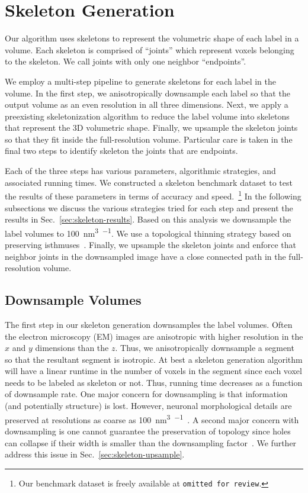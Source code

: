 \section{Skeleton Generation}

Our algorithm uses skeletons to represent the volumetric shape of each label in a volume.
Each skeleton is comprised of ``joints'' which represent voxels belonging to the skeleton.
We call joints with only one neighbor ``endpoints''.

We employ a multi-step pipeline to generate skeletons for each label in the volume.
In the first step, we anisotropically downsample each label so that the output volume as an even resolution in all three dimensions.
Next, we apply a preexisting skeletonization algorithm to reduce the label volume into skeletons that represent the 3D volumetric shape.
Finally, we upsample the skeleton joints so that they fit inside the full-resolution volume.
Particular care is taken in the final two steps to identify skeleton the joints that are endpoints.

Each of the three steps has various parameters, algorithmic strategies, and associated running times. 
We constructed a skeleton benchmark dataset to test the results of these parameters in terms of accuracy and speed.~\footnote{Our benchmark dataset is freely available at \texttt{omitted for review}.}
In the following subsections we discuss the various strategies tried for each step and present the results in Sec.~\ref{sec:skeleton-results}.
Based on this analysis we downsample the label volumes to \SI{100}{\cubic\nano\meter\per\voxel}.
We use a topological thinning strategy based on preserving isthmuses~\cite{palagyi2014sequential}.
Finally, we upsample the skeleton joints and enforce that neighbor joints in the downsampled image have a close connected path in the full-resolution volume. 

\subsection{Downsample Volumes}
	
The first step in our skeleton generation downsamples the label volumes.
Often the electron microscopy (EM) images are anisotropic with higher resolution in the $x$ and $y$ dimensions than the $z$. 
Thus, we anisotropically downsample a segment so that the resultant segment is isotropic.
At best a skeleton generation algorithm will have a linear runtime in the number of voxels in the segment since each voxel needs to be labeled as skeleton or not.
Thus, running time decreases as a function of downsample rate.
One major concern for downsampling is that information (and potentially structure) is lost.
However, neuronal morphological details are preserved at resolutions as coarse as \SI{100}{\cubic\nano\meter\per\voxel}~\cite{rolnick2017morphological}.
A second major concern with downsampling is one cannot guarantee the preservation of topology since holes can collapse if their width is smaller than the downsampling factor~\cite{kraus2001topology}.
We further address this issue in Sec.~\ref{sec:skeleton-upsample}.

